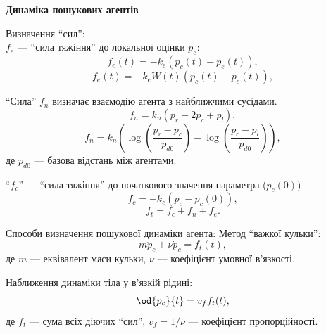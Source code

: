 \documentclass[14pt,handout,utf8]{beamer}
\newcommand{\Xhead}[1]{
 \begin{center}%
      \textbf{#1}%
 \end{center}%
}
\begin{document}
\begin{frame}
  \frametitle{~}

  \Xhead{Динаміка пошукових агентів}

  Визначення ``сил'': \\
  $f_e$ ---
  ``сила тяжіння'' до локальної оцінки $p_e$:
  \begin{equation}
    f_e(t) = - k_e \left( p_c(t) - p_e(t) \right)  ,
    \label{atu:eq:f_e_lin}
  \end{equation}
  \begin{equation}
    f_e(t) = - k_e W(t) \left( p_c(t) - p_e(t) \right) ,
    \label{atu:eq:f_e_lin_W}
  \end{equation}

  ``Сила'' $f_n$ визначає взаємодію агента з найближчими сусідами.
  \begin{equation}
    f_n = k_n ( p_r - 2 p_c + p_l ),
    \label{atu:eq:f_n_lin}
  \end{equation}
  \begin{equation}
    f_n = k_n \left( \log\left( \frac{p_r-p_c}{p_{d0}} \right) -  \log\left( \frac{p_c-p_l}{p_{d0}}\right) \right),
    \label{atu:eq:f_n_log}
  \end{equation}
  де
  $p_{d0}$ ---
  базова відстань між агентами.

 ``$f_c$'' --- ``сила тяжіння'' до початкового значення параметра ($p_{c}(0)$)
  \begin{equation}
    f_c = -k_c (p_c - p_{c}(0)) ,
    \label{atu:eq:f_c}
  \end{equation}
  \begin{equation}
  f_t = f_c + f_n + f_e .
  \label{atu:eq:f_t}
\end{equation}

  Способи визначення пошукової динаміки агента:
  Метод ``важкої кульки'':
  \begin{equation}
    m \ddot{p}_c + \nu \dot{p}_c = f_t(t),
    \label{atu:eq:heavy_ball}
  \end{equation}
  де $m$ --- еквівалент маси кульки, $\nu$ --- коефіцієнт умовної в'язкості.

  Наближення динаміки тіла у в'язкій рідині:
  \begin{equation}
    \od{p_c}{t} = v_f f_t(t),
    \label{atu:eq:v_f}
  \end{equation}
  де $f_t$ --- сума всіх діючих ``сил'',
  $v_f = 1 / \nu$ --- коефіцієнт
  пропорційності.
\end{frame}
\end{document}
